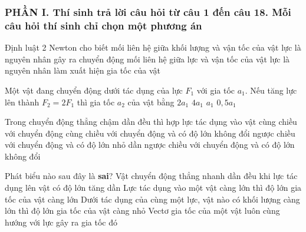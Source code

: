 \newpage

\subsubsection*{PHẦN I. Thí sinh trả lời câu hỏi từ câu 1 đến câu 18. Mỗi câu hỏi thí sinh chỉ chọn một phương án}
\setcounter{ex}{0}
\begin{ex}%
Định luật 2 Newton cho biết
\choice
{mối liên hệ giữa khối lượng và vận tốc của vật}
{lực là nguyên nhân gây ra chuyển động}
{mối liên hệ giữa lực và vận tốc của vật}
{\True lực là nguyên nhân làm xuất hiện gia tốc của vật}
 \end{ex}
\begin{ex}%
Một vật đang chuyển động dưới tác dụng của lực $F_1$ với gia tốc $a_1$. Nếu tăng lực lên thành $F_2 = 2F_1$ thì gia tốc $a_2$ của vật bằng
\choice
{\True $2a_1$}
{$4a_1$}
{$a_1$}
{$0,5a_1$}
 \end{ex}
\begin{ex}%
Trong chuyển động thẳng chậm dần đều thì hợp lực tác dụng vào vật
\choice
{cùng chiều với chuyển động}
{cùng chiều với chuyển động và có độ lớn không đổi}
{ngược chiều với chuyển động và có độ lớn nhỏ dần}
{\True ngược chiều với chuyển động và có độ lớn không đổi}
 \end{ex}
\begin{ex}%
Phát biểu nào sau đây là \textbf{sai}?
\choice
{\True Vật chuyển động thẳng nhanh dần đều khi lực tác dụng lên vật có độ lớn tăng dần}
{Lực tác dụng vào một vật càng lớn thì độ lớn gia tốc của vật càng lớn}
{Dưới tác dụng của cùng một lực, vật nào có khối lượng càng lớn thì độ lớn gia tốc của vật càng nhỏ}
{Vectơ gia tốc của một vật luôn cùng hướng với lực gây ra gia tốc đó}
  \end{ex}
